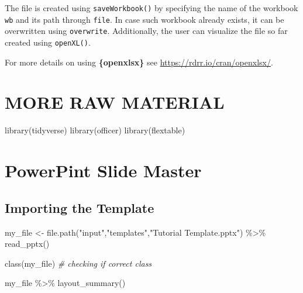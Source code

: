 \documentclass[
]{book}
\newenvironment{Shaded}{\begin{snugshade}}{\end{snugshade}}
\newcommand{\CommentTok}[1]{\textcolor[rgb]{0.56,0.35,0.01}{\textit{#1}}}
\newcommand{\FunctionTok}[1]{\textcolor[rgb]{0.00,0.00,0.00}{#1}}
\newcommand{\NormalTok}[1]{#1}
\newcommand{\OtherTok}[1]{\textcolor[rgb]{0.56,0.35,0.01}{#1}}
\newcommand{\SpecialCharTok}[1]{\textcolor[rgb]{0.00,0.00,0.00}{#1}}
\newcommand{\StringTok}[1]{\textcolor[rgb]{0.31,0.60,0.02}{#1}}
\begin{document}
The file is created using \texttt{saveWorkbook()} by specifying the name of the workbook \texttt{wb} and its path through \texttt{file}. In case such workbook already exists, it can be overwritten using \texttt{overwrite}. Additionally, the user can visualize the file so far created using \texttt{openXL()}.

For more details on using \textbf{\{openxlsx\}} see \url{https://rdrr.io/cran/openxlsx/}.

\hypertarget{more-raw-material}{%
\section{MORE RAW MATERIAL}\label{more-raw-material}}

\begin{Shaded}
\begin{Highlighting}[]
\FunctionTok{library}\NormalTok{(tidyverse)}
\FunctionTok{library}\NormalTok{(officer)}
\FunctionTok{library}\NormalTok{(flextable)}
\end{Highlighting}
\end{Shaded}

\hypertarget{powerpint-slide-master}{%
\section{PowerPint Slide Master}\label{powerpint-slide-master}}

\hypertarget{importing-the-template}{%
\subsection{Importing the Template}\label{importing-the-template}}

\begin{Shaded}
\begin{Highlighting}[]
\NormalTok{my\_file }\OtherTok{\textless{}{-}} \FunctionTok{file.path}\NormalTok{(}\StringTok{"input"}\NormalTok{,}\StringTok{"templates"}\NormalTok{,}\StringTok{"Tutorial Template.pptx"}\NormalTok{) }\SpecialCharTok{\%\textgreater{}\%} 
                        \FunctionTok{read\_pptx}\NormalTok{()}

\FunctionTok{class}\NormalTok{(my\_file) }\CommentTok{\# checking if correct class}

\NormalTok{my\_file }\SpecialCharTok{\%\textgreater{}\%}
  \FunctionTok{layout\_summary}\NormalTok{()}
\end{Highlighting}
\end{Shaded}
\end{document}
